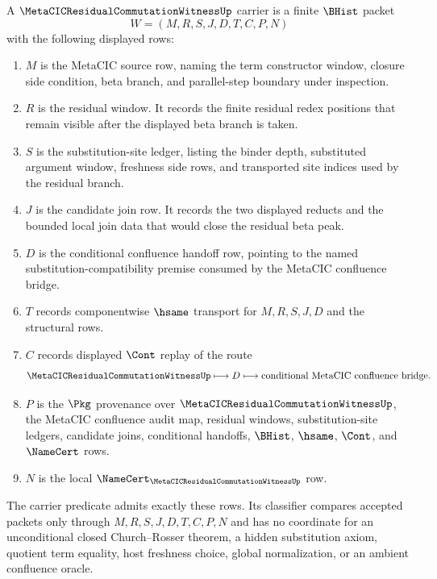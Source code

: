 \begin{definition}
\label{def:metacic-residual-commutation-witness-carrier}
A $\MetaCICResidualCommutationWitnessUp$ carrier is a finite $\BHist$ packet
$$
W=(M,R,S,J,D,T,C,P,N)
$$
with the following displayed rows:
\begin{enumerate}
\item $M$ is the MetaCIC source row, naming the term constructor window, closure side condition, beta branch, and parallel-step boundary under inspection.
\item $R$ is the residual window. It records the finite residual redex positions that remain visible after the displayed beta branch is taken.
\item $S$ is the substitution-site ledger, listing the binder depth, substituted argument window, freshness side rows, and transported site indices used by the residual branch.
\item $J$ is the candidate join row. It records the two displayed reducts and the bounded local join data that would close the residual beta peak.
\item $D$ is the conditional confluence handoff row, pointing to the named substitution-compatibility premise consumed by the MetaCIC confluence bridge.
\item $T$ records componentwise $\hsame$ transport for $M,R,S,J,D$ and the structural rows.
\item $C$ records displayed $\Cont$ replay of the route
$$
\MetaCICResidualCommutationWitnessUp
\longmapsto D
\longmapsto \text{conditional MetaCIC confluence bridge}.
$$
\item $P$ is the $\Pkg$ provenance over $\MetaCICResidualCommutationWitnessUp$, the MetaCIC confluence audit map, residual windows, substitution-site ledgers, candidate joins, conditional handoffs, $\BHist$, $\hsame$, $\Cont$, and $\NameCert$ rows.
\item $N$ is the local $\NameCert_{\MetaCICResidualCommutationWitnessUp}$ row.
\end{enumerate}
The carrier predicate admits exactly these rows. Its classifier compares accepted packets only through $M,R,S,J,D,T,C,P,N$ and has no coordinate for an unconditional closed Church--Rosser theorem, a hidden substitution axiom, quotient term equality, host freshness choice, global normalization, or an ambient confluence oracle.
\end{definition}

